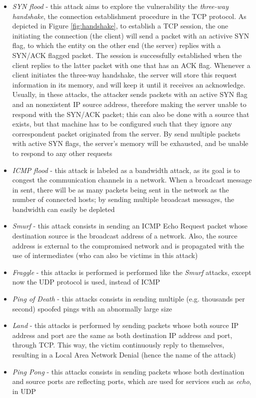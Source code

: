 \documentclass[runningheads,a4paper]{llncs}
\begin{document}
\begin{itemize}
\item \emph{SYN flood} - this attack aims to explore the vulnerability the \textit{three-way handshake}, the connection establishment procedure in the TCP protocol. As depicted in Figure \ref{fig:handshake}, to establish a TCP session, the one initiating the connection (the client) will send a packet with an activive SYN flag, to which the entity on the other end (the server) replies with a SYN/ACK flagged packet. The session is successfully established when the client replies to the latter packet with one that has an ACK flag. Whenever a client initiates the three-way handshake, the server will store this request information in its memory, and will keep it until it receives an acknowledge. Usually, in these attacks, the attacker sends packets with an active SYN flag and an nonexistent IP source address, therefore making the server unable to respond with the SYN/ACK packet; this can also be done with a source that exists, but that machine has to be configured such that they ignore any correspondent packet originated from the server. By send multiple packets with active SYN flags, the server's memory will be exhausted, and be unable to respond to any other requests


\item \emph{ICMP flood} - this attack is labeled as a bandwidth attack, as its goal is to congest the communication channels in a network. When a broadcast message in sent, there will be as many packets being sent in the network as the number of connected hosts; by sending multiple broadcast messages, the bandwidth can easily be depleted


\item \emph{Smurf} - this attack consists in sending an ICMP Echo Request packet whose destination source is the broadcast address of a network. Also, the source address is external to the compromised network and is propagated with the use of intermediates (who can also be victims in this attack)

\item \emph{Fraggle} - this attacks is performed is performed like the \textit{Smurf} attacks, except now the UDP protocol is used, instead of ICMP

\item \emph{Ping of Death} - this attacks consists in sending multiple (e.g. thousands per second) spoofed pings with an abnormally large size
 
\item \emph{Land} - this attacks is performed by sending packets whose both source IP address and port are the same as both destination IP address and port, through TCP. This way, the victim continuously reply to themselves, resulting in a Local Area Network Denial (hence the name of the attack) 

\item \emph{Ping Pong} - this attacks consists in sending packets whose both destination and source ports are reflecting ports, which are used for services such as \textit{echo}, in UDP

\end{itemize}
\end{document}
